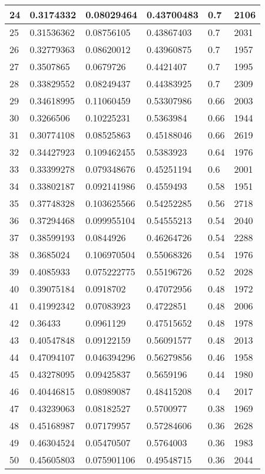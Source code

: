\begin{longtable}{|l|l|l|l|l|l|}
24 & 0.3174332 & 0.08029464 & 0.43700483 & 0.7 & 2106 \\ \hline 
25 & 0.31536362 & 0.08756105 & 0.43867403 & 0.7 & 2031 \\ \hline 
26 & 0.32779363 & 0.08620012 & 0.43960875 & 0.7 & 1957 \\ \hline 
27 & 0.3507865 & 0.0679726 & 0.4421407 & 0.7 & 1995 \\ \hline 
28 & 0.33829552 & 0.08249437 & 0.44383925 & 0.7 & 2309 \\ \hline 
29 & 0.34618995 & 0.11060459 & 0.53307986 & 0.66 & 2003 \\ \hline 
30 & 0.3266506 & 0.10225231 & 0.5363984 & 0.66 & 1944 \\ \hline 
31 & 0.30774108 & 0.08525863 & 0.45188046 & 0.66 & 2619 \\ \hline 
32 & 0.34427923 & 0.109462455 & 0.5383923 & 0.64 & 1976 \\ \hline 
33 & 0.33399278 & 0.079348676 & 0.45251194 & 0.6 & 2001 \\ \hline 
34 & 0.33802187 & 0.092141986 & 0.4559493 & 0.58 & 1951 \\ \hline 
35 & 0.37748328 & 0.103625566 & 0.54252285 & 0.56 & 2718 \\ \hline 
36 & 0.37294468 & 0.099955104 & 0.54555213 & 0.54 & 2040 \\ \hline 
37 & 0.38599193 & 0.0844926 & 0.46264726 & 0.54 & 2288 \\ \hline 
38 & 0.3685024 & 0.106970504 & 0.55068326 & 0.54 & 1976 \\ \hline 
39 & 0.4085933 & 0.075222775 & 0.55196726 & 0.52 & 2028 \\ \hline 
40 & 0.39075184 & 0.0918702 & 0.47072956 & 0.48 & 1972 \\ \hline 
41 & 0.41992342 & 0.07083923 & 0.4722851 & 0.48 & 2006 \\ \hline 
42 & 0.36433 & 0.0961129 & 0.47515652 & 0.48 & 1978 \\ \hline 
43 & 0.40547848 & 0.09122159 & 0.56091577 & 0.48 & 2013 \\ \hline 
44 & 0.47094107 & 0.046394296 & 0.56279856 & 0.46 & 1958 \\ \hline 
45 & 0.43278095 & 0.09425837 & 0.5659196 & 0.44 & 1980 \\ \hline 
46 & 0.40446815 & 0.08989087 & 0.48415208 & 0.4 & 2017 \\ \hline 
47 & 0.43239063 & 0.08182527 & 0.5700977 & 0.38 & 1969 \\ \hline 
48 & 0.45168987 & 0.07179957 & 0.57284606 & 0.36 & 2628 \\ \hline 
49 & 0.46304524 & 0.05470507 & 0.5764003 & 0.36 & 1983 \\ \hline 
50 & 0.45605803 & 0.075901106 & 0.49548715 & 0.36 & 2044 \\ \hline 
\end{longtable}